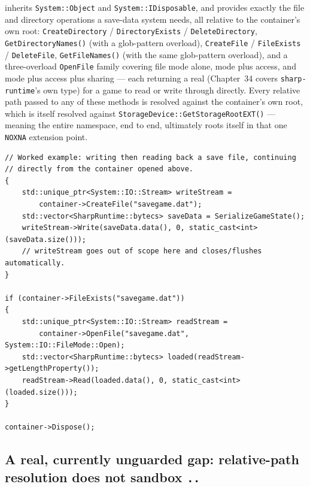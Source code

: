  inherits \texttt{System::Object} and \texttt{System::IDisposable},
and provides exactly the file and directory operations a save-data system needs, all relative
to the container's own root: \texttt{CreateDirectory} / \texttt{DirectoryExists} /
\texttt{DeleteDirectory}, \texttt{GetDirectoryNames()} (with a glob-pattern overload),
\texttt{CreateFile} / \texttt{FileExists} / \texttt{DeleteFile}, \texttt{GetFileNames()} (with the
same glob-pattern overload), and a three-overload \texttt{OpenFile} family covering file mode
alone, mode plus access, and mode plus access plus sharing --- each returning a real
 (Chapter~34 covers \texttt{sharp-runtime}'s own 
type) for a game to read or write through directly. Every relative path
passed to any of these methods is resolved against the container's own root, which is itself
resolved against \texttt{StorageDevice::GetStorageRootEXT()} --- meaning the entire
namespace, end to end, ultimately roots itself in that one \texttt{NOXNA} extension point.

\begin{lstlisting}
// Worked example: writing then reading back a save file, continuing
// directly from the container opened above.
{
    std::unique_ptr<System::IO::Stream> writeStream =
        container->CreateFile("savegame.dat");
    std::vector<SharpRuntime::bytecs> saveData = SerializeGameState();
    writeStream->Write(saveData.data(), 0, static_cast<int>(saveData.size()));
    // writeStream goes out of scope here and closes/flushes automatically.
}

if (container->FileExists("savegame.dat"))
{
    std::unique_ptr<System::IO::Stream> readStream =
        container->OpenFile("savegame.dat", System::IO::FileMode::Open);
    std::vector<SharpRuntime::bytecs> loaded(readStream->getLengthProperty());
    readStream->Read(loaded.data(), 0, static_cast<int>(loaded.size()));
}

container->Dispose();
\end{lstlisting}

\subsection{A real, currently unguarded gap: relative-path resolution does not sandbox \texttt{..}}

